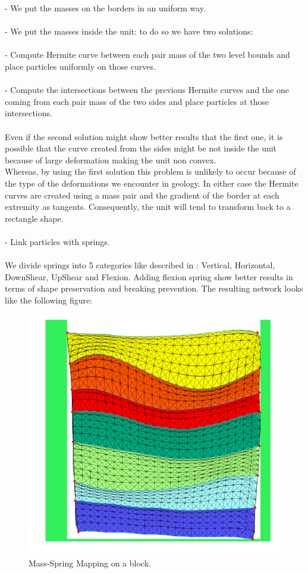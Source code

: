 \documentclass[12pt, a4paper]{report} %
\begin{document}
\indent	- We put the masses on the borders in an uniform way.\\\\
\indent	- We put the masses inside the unit: to do so we have two solutions:\\\\
\indent \indent	- Compute Hermite curve between each pair mass of the two level bounds and place particles uniformly on those curves.\\\\
\indent \indent	- Compute the intersections between the previous Hermite curves and the one coming from each pair mass of the two sides and place particles at those intersections.\\\\
	Even if the second solution might show better results that the first one, it is possible that the curve created from the sides might be not inside the unit because of large deformation making the unit non convex. \\Whereas, by using the first solution this problem is unlikely to occur because of the type of the deformations we encounter in geology. In either case the Hermite curves are created using a mass pair and the gradient of the border at each extremity as tangents. Consequently, the unit will tend to transform back to a rectangle shape.\\\\
\indent	- Link particles with springs. \\\\We divide springs into 5 categories like described in \cite{cloth}: Vertical, Horizontal, DownShear, UpShear and Flexion. Adding flexion spring show better results in terms of shape preservation and breaking prevention. The resulting network looks like the following figure:\\
	
	\begin{figure}[H]
	\centering
	\includegraphics[scale=0.5]{springMapping.png}
	\caption{Mass-Spring Mapping on a block.}
	\end{figure}
	
\end{document}
